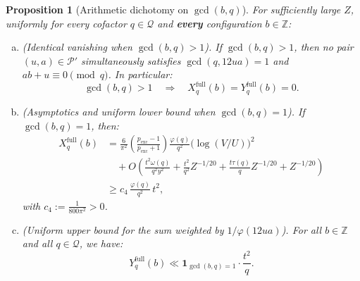 \documentclass[11pt, a4paper]{article}
\theoremstyle{plain}
\newtheorem{proposition}[theorem]{Proposition}
\theoremstyle{definition}
\newcommand{\Z}{\mathbb{Z}}
\newcommand{\ind}{\mathbf{1}}
\begin{document}
\begin{proposition}[Arithmetic dichotomy on $\gcd(b,q)$]\label{prop:dichotomie_uniforme_b}
For sufficiently large $Z$, uniformly for every cofactor $q \in \mathcal{Q}$ and \textbf{every} configuration $b \in \Z$:
\begin{enumerate}[(a)]
    \item \emph{(Identical vanishing when $\gcd(b,q) > 1$).} If $\gcd(b, q) > 1$, then no pair $(u,a) \in \mathcal{P}'$ simultaneously satisfies $\gcd(q, 12ua) = 1$ and $ab + u \equiv 0 \pmod q$. In particular:
    \[
    \gcd(b, q) > 1 \quad \Longrightarrow \quad X_q^{\mathrm{full}}(b) = Y_q^{\mathrm{full}}(b) = 0.
    \]
    \item \emph{(Asymptotics and uniform lower bound when $\gcd(b,q) = 1$).} If $\gcd(b, q) = 1$, then:
    \begin{align}
    X_q^{\mathrm{full}}(b) &= \frac{6}{\pi^2}\left(\frac{p_{\mathrm{exc}}-1}{p_{\mathrm{exc}}+1}\right)\frac{\varphi(q)}{q^2}\big(\log(V/U)\big)^2 \nonumber\\
    &\quad + O\!\left(\frac{t^2 \omega(q)}{q^2 y^2} + \frac{t^2}{q^2} Z^{-1/20} + \frac{t \tau(q)}{q} Z^{-1/20} + Z^{-1/20}\right) \nonumber\\
    &\ge c_4\,\frac{\varphi(q)}{q^2}\,t^2, \tag{C}\label{eq:borne_C_sec}
    \end{align}
    with $c_4 := \frac{1}{800\pi^2} > 0$.
    \item \emph{(Uniform upper bound for the sum weighted by $1/\varphi(12ua)$).} For all $b \in \Z$ and all $q \in \mathcal{Q}$, we have:
    \begin{equation}\label{eq:borne_D_sec}
    Y_q^{\mathrm{full}}(b) \ll \ind_{\gcd(b,q)=1} \cdot \frac{t^2}{q}. \tag{D}
    \end{equation}
\end{enumerate}
\end{proposition}
\end{document}
